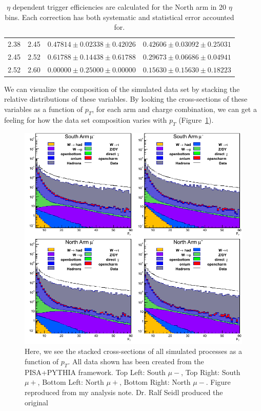 \begin{table}
\begin{tabular}{cccc}
    2.38 & 2.45 & $0.47814 \pm 0.02338 \pm 0.42026$ & $0.42606 \pm 0.03092 \pm 0.25031$ \\
    2.45 & 2.52 & $0.61788 \pm 0.14438 \pm 0.61788$ & $0.29673 \pm 0.06686 \pm 0.04941$ \\
    2.52 & 2.60 & $0.00000 \pm 0.25000 \pm 0.00000$ & $0.15630 \pm 0.15630 \pm 0.18223$ \\
    \bottomrule
  \end{tabular}
  \caption{
    $\eta$ dependent trigger efficiencies are calculated for the North arm in 20
    $\eta$ bins. Each correction has both systematic and statistical error
    accounted for.
  }
  \label{tab:rapidity_corrections_north}
\end{table}

We can visualize the composition of the simulated data set by stacking the
relative distributions of these variables. By looking the cross-sections of
these variables as a function of $p_T$, for each arm and charge combination, we
can get a feeling for how the data set composition varies with $p_T$
(Figure~\ref{fig:stacked_xsec_sim}).

\begin{figure}[ht]

  \includegraphics[width=\linewidth]{./figures/stacked_xsec.png}
  \caption{
    Here, we see the stacked cross-sections of all simulated processes as a
    function of $p_T$. All data shown has been created from the PISA+PYTHIA
    framework. Top Left: South $\mu-$, Top Right: South $\mu+$, Bottom Left:
    North $\mu+$, Bottom Right: North $\mu-$. Figure reproduced from my analysis
    note. Dr. Ralf Seidl produced the original ~\cite{Seidl2014}
  }
  \label{fig:stacked_xsec_sim}
\end{figure}

